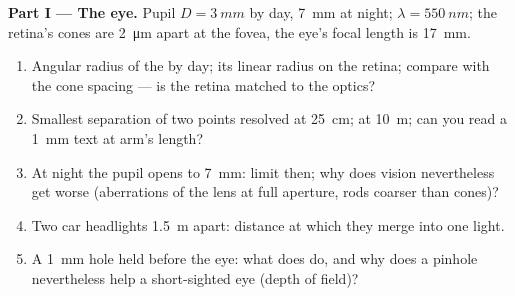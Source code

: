\begin{problem}
\label{pb:b2:diffraction:1}

\medskip
\noindent\textbf{Part I --- The eye.}
Pupil $D = \qty{3}{mm}$ by day, \qty{7}{mm} at night; $\lambda = \qty{550}{nm}$; the
retina's cones are \qty{2}{\micro m} apart at the fovea, the eye's focal
length is \qty{17}{mm}.
\begin{enumerate}
  \item Angular radius of the  by day; its linear radius on
        the retina; compare with the cone spacing --- is the retina
        matched to the optics?
  \item Smallest separation of two points resolved at \qty{25}{cm}; at
        \qty{10}{m}; can you read a \qty{1}{mm} text at arm's length?
  \item At night the pupil opens to \qty{7}{mm}:  limit then;
        why does vision nevertheless get worse (aberrations of the
        lens at full aperture, rods coarser than cones)?
  \item Two car headlights \qty{1.5}{m} apart: distance at which they merge
        into one light.
  \item A \qty{1}{mm} hole held before the eye: what does  do,
        and why does a pinhole nevertheless help a short-sighted eye
        (depth of field)?
\end{enumerate}


\end{problem}
